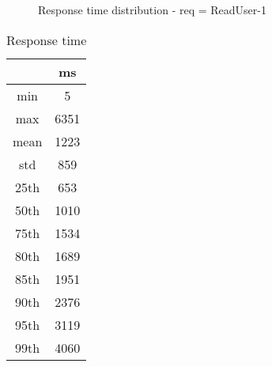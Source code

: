 \begin{minipage}{0.75\linewidth}
\begin{figure}[h]
\begin{adjustbox}{max width=1.0\linewidth, keepaspectratio}
  \end{adjustbox}
  \caption{Response time distribution - req = ReadUser-1}
\end{figure}
\end{minipage}\hfill\begin{minipage}{0.18\linewidth}
\begin{table}[h]
\begin{tabular}{|cc|}
\hline
\textbf{} & \textbf{ms}\\ \hline
 \Xhline{0.005\arrayrulewidth}
min & 5\\
 \Xhline{0.005\arrayrulewidth}
max & 6351\\
 \Xhline{0.005\arrayrulewidth}
mean & 1223\\
 \Xhline{0.005\arrayrulewidth}
std & 859\\
\hline
\hline
 \Xhline{0.005\arrayrulewidth}
25th & 653\\
 \Xhline{0.005\arrayrulewidth}
50th & 1010\\
 \Xhline{0.005\arrayrulewidth}
75th & 1534\\
 \Xhline{0.005\arrayrulewidth}
80th & 1689\\
 \Xhline{0.005\arrayrulewidth}
85th & 1951\\
 \Xhline{0.005\arrayrulewidth}
90th & 2376\\
 \Xhline{0.005\arrayrulewidth}
95th & 3119\\
 \Xhline{0.005\arrayrulewidth}
99th & 4060\\
\hline
\end{tabular}
\caption{Response time}
\end{table}
\end{minipage}\hfill